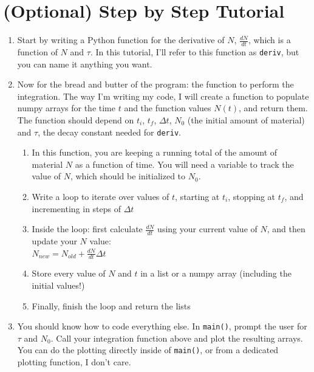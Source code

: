 \documentclass{article}
\begin{document}
\section*{(Optional) Step by Step Tutorial}
\begin{enumerate}
	\item Start by writing a Python function for the derivative of $N$, $\frac{dN}{dt}$, which is a function of $N$ and $\tau$. In this tutorial, I'll refer to this function as \texttt{deriv}, but you can name it anything you want.
	\item Now for the bread and butter of the program: the function to perform the integration. The way I'm writing my code, I will create a function to populate numpy arrays for the time $t$ and the function values $N(t)$, and return them. The function should depend on $t_i$, $t_f$, $\Delta t$, $N_0$ (the initial amount of material) and $\tau$, the decay constant needed for \texttt{deriv}.
	\begin{enumerate}
		\item In this function, you are keeping a running total of the amount of material $N$ as a function of time. You will need a variable to track the value of $N$, which should be initialized to $N_0$.
		\item Write a loop to iterate over values of $t$, starting at $t_i$, stopping at $t_f$, and incrementing in steps of $\Delta t$
		\item Inside the loop: first calculate $\frac{dN}{dt}$ using your current value of $N$, and then update your $N$ value:\\ $N_{new}=N_{old}+\frac{dN}{dt}\Delta t$
		\item Store every value of $N$ and $t$ in a list or a numpy array (including the initial values!)
		\item Finally, finish the loop and return the lists
	\end{enumerate}
	\item You should know how to code everything else. In \texttt{main()}, prompt the user for $\tau$ and $N_0$. Call your integration function above and plot the resulting arrays. You can do the plotting directly inside of \texttt{main()}, or from a dedicated plotting function, I don't care.
\end{enumerate}
\end{document}
